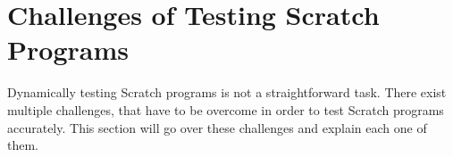 %
%
%

\section{Challenges of Testing Scratch Programs}


Dynamically testing Scratch programs is not a straightforward task.
There exist multiple challenges, that have to be overcome in order to test Scratch programs accurately.
This section will go over these challenges and explain each one of them.
\parspace

